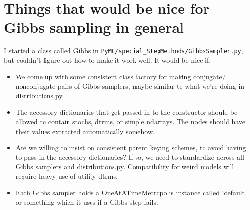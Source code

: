 \documentclass{article}
\begin{document}
\section{Things that would be nice for Gibbs sampling in general}
I started a class called Gibbs in \texttt{PyMC/special\_StepMethods/GibbsSampler.py}, but couldn't figure out how to make it work well. It would be nice if:  
\begin{itemize}
	\item We come up with some consistent class factory for making conjugate/ nonconjugate pairs of Gibbs samplers, maybe similar to what we're doing in distributions.py.	
	\item The accessory dictionaries that get passed in to the constructor should be allowed to contain stochs, dtrms, or simple ndarrays. The nodes should have their values extracted automatically somehow.
	\item Are we willing to insist on consistent parent keying schemes, to avoid having to pass in the accessory dictionaries? If so, we need to standardize across all Gibbs samplers and distributions.py. Compatibility for weird models will require heavy use of utility dtrms.
	\item Each Gibbs sampler holds a OneAtATimeMetropolis instance called `default' or something which it uses if a Gibbs step fails.
\end{itemize} 
\end{document}
